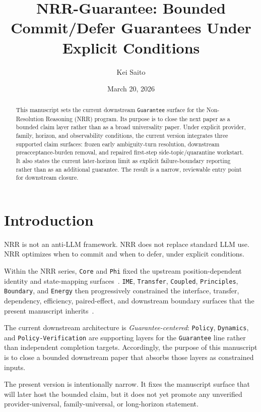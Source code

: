 \documentclass[11pt]{article}
\title{NRR-Guarantee: Bounded Commit/Defer Guarantees Under Explicit Conditions}
\author{Kei Saito}
\date{March 20, 2026}
\begin{document}
\maketitle

\begin{abstract}
This manuscript sets the current downstream \texttt{Guarantee} surface for the
Non-Resolution Reasoning (NRR) program. Its purpose is to close the next paper
as a bounded claim layer rather than as a broad universality paper. Under
explicit provider, family, horizon, and observability conditions, the current
version integrates three supported claim surfaces: frozen early ambiguity-turn
resolution, downstream preacceptance-burden removal, and repaired first-step
side-topic/quarantine workstart. It also states the current later-horizon limit
as explicit failure-boundary reporting rather than as an additional guarantee.
The result is a narrow, reviewable entry point for downstream closure.
\end{abstract}

\section{Introduction}

NRR is not an anti-LLM framework. NRR does not replace standard LLM use. NRR
optimizes when to commit and when to defer, under explicit conditions.

Within the NRR series, \texttt{Core} and \texttt{Phi} fixed the upstream
position-dependent identity and state-mapping surfaces~\cite{saito2025nrr,saito2026phi}.
\texttt{IME}, \texttt{Transfer}, \texttt{Coupled}, \texttt{Principles},
\texttt{Boundary}, and \texttt{Energy} then progressively constrained the
interface, transfer, dependency, efficiency, paired-effect, and downstream
boundary surfaces that the present manuscript inherits~\cite{saito2026ime,saito2026transfer,saito2026coupled,saito2026principles,saito2026boundary,saito2026energy}.

The current downstream architecture is \textit{Guarantee-centered}: \texttt{Policy},
\texttt{Dynamics}, and \texttt{Policy-Verification} are supporting layers for the
\texttt{Guarantee} line rather than independent completion targets. Accordingly, the
purpose of this manuscript is to close a bounded downstream paper that absorbs those
layers as constrained inputs.

The present version is intentionally narrow. It fixes the manuscript surface that
will later host the bounded claim, but it does not yet promote any unverified
provider-universal, family-universal, or long-horizon statement.
\end{document}
